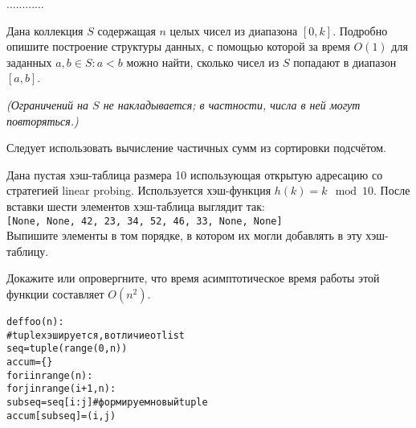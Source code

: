 \documentclass[12pt]{exam}
\begin{document}
\begin{questions}

\begin{solution}
............
\end{solution}

\question[5] Дана коллекция $S$ содержащая $n$ целых чисел из диапазона $[0, k]$. Подробно опишите построение структуры данных, с помощью которой за время $O(1)$ для заданных $a, b \in S : a < b$ можно найти, сколько чисел из $S$ попадают в диапазон $[a, b]$.

{\em (Ограничений на $S$ не накладывается; в частности, числа в ней могут повторяться.)}

\begin{solution}
Следует использовать вычисление частичных сумм из сортировки подсчётом.
\end{solution}


\question[3] Дана пустая хэш-таблица размера 10 использующая открытую адресацию со стратегией linear probing. Используется хэш-функция $h(k) = k \mod 10$. После вставки шести элементов хэш-таблица выглядит так:\\
{\tt [None, None, 42, 23, 34, 52, 46, 33, None, None]}\\
Выпишите элементы в том порядке, в котором их могли добавлять в эту хэш-таблицу.

\question[6] Докажите или опровергните, что время асимптотическое время работы этой функции составляет $O(n^2)$.
\begin{alltt}
def foo(n):
    # tuple хэшируется, в отличие от list
    seq = tuple(range(0, n))
    accum = \{\}
    for i in range(n):
        for j in range(i+1, n):
            subseq = seq[i:j]  # формируем новый tuple
            accum[subseq] = (i, j)
\end{alltt}


\end{questions}
\end{document}

